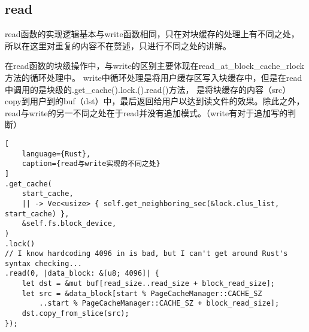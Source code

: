 \subsection{read}
read函数的实现逻辑基本与write函数相同，只在对块缓存的处理上有不同之处，所以在这里对重复的内容不在赘述，只进行不同之处的讲解。

在read函数的块级操作中，与write的区别主要体现在read_at_block_cache_rlock方法的循环处理中。
write中循环处理是将用户缓存区写入块缓存中，但是在read中调用的是块级的.get_cache().lock.().read()方法，
是将块缓存的内容（src）copy到用户到的buf（dst）中，最后返回给用户以达到读文件的效果。除此之外，read与write的另一不同之处在于read并没有追加模式。（write有对于追加写的判断）

\begin{lstlisting}[
    language={Rust},
    caption={read与write实现的不同之处}
]
.get_cache(
    start_cache,
    || -> Vec<usize> { self.get_neighboring_sec(&lock.clus_list, start_cache) },
    &self.fs.block_device,
)
.lock()
// I know hardcoding 4096 in is bad, but I can't get around Rust's syntax checking...
.read(0, |data_block: &[u8; 4096]| {
    let dst = &mut buf[read_size..read_size + block_read_size];
    let src = &data_block[start % PageCacheManager::CACHE_SZ
        ..start % PageCacheManager::CACHE_SZ + block_read_size];
    dst.copy_from_slice(src);
});
\end{lstlisting}


